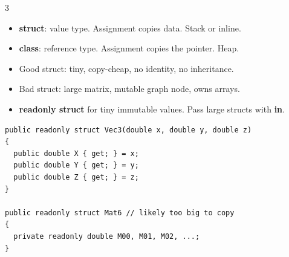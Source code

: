 \documentclass[9pt,a4paper]{extarticle}
\newenvironment{card}[3][acBlue]{%
  \begin{tcolorbox}[
    enhanced, colback=#2, colframe=bdCard,
    coltitle=black, colbacktitle=#2!70!bgHdr,
    fonttitle=\bfseries\fontsize{6.0pt}{7.2pt}\selectfont\MakeUppercase,
    title={#3},
    left=3pt, right=2pt, top=1.2pt, bottom=1.6pt,
    toptitle=1.0pt, bottomtitle=1.0pt,
    boxrule=0.4pt,
    borderline west={3pt}{0pt}{#1},
    arc=2pt, before skip=0pt, after skip=1.6mm,
    breakable,
  ]}{\end{tcolorbox}}
\newcommand{\code}[1]{{\ttfamily\bfseries #1}}
\begin{document}
\begin{multicols}{3}
\begin{card}[acRed]{bgRed}{Struct vs Class}
\begin{itemize}
\item \code{struct}: value type. Assignment copies data. Stack or inline.
\item \code{class}: reference type. Assignment copies the pointer. Heap.
\item Good struct: tiny, copy-cheap, no identity, no inheritance.
\item Bad struct: large matrix, mutable graph node, owns arrays.
\item \code{readonly struct} for tiny immutable values. Pass large structs with \code{in}.
\end{itemize}
\begin{lstlisting}[style=cs]
public readonly struct Vec3(double x, double y, double z)
{
  public double X { get; } = x;
  public double Y { get; } = y;
  public double Z { get; } = z;
}

public readonly struct Mat6 // likely too big to copy
{
  private readonly double M00, M01, M02, ...;
}
\end{lstlisting}
\end{card}

\end{multicols}
\end{document}

